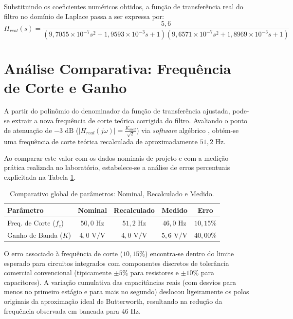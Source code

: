 Substituindo os coeficientes numéricos obtidos, a função de transferência real do filtro no domínio de Laplace passa a ser expressa por:
\begin{equation}
	H_{real}(s) = \frac{5,6}{(9,7055 \times 10^{-7} s^2 + 1,9593 \times 10^{-3} s + 1)(9,6571 \times 10^{-7} s^2 + 1,8969 \times 10^{-3} s + 1)}
\end{equation}

\section{Análise Comparativa: Frequência de Corte e Ganho}

A partir do polinômio do denominador da função de transferência ajustada, pode-se extrair a nova frequência de corte teórica corrigida do filtro. Avaliando o ponto de atenuação de $-3\text{ dB}$ ($|H_{real}(j\omega)| = \frac{K_{med}}{\sqrt{2}}$) via \textit{software} algébrico \cite{maxima}, obtém-se uma frequência de corte teórica recalculada de aproximadamente $51,2\text{ Hz}$.

Ao comparar este valor com os dados nominais de projeto e com a medição prática realizada no laboratório, estabelece-se a análise de erros percentuais explicitada na Tabela \ref{tab:comparativo_erros}.

\begin{table}[htbp]
	\centering
	\caption{Comparativo global de parâmetros: Nominal, Recalculado e Medido.}
	\label{tab:comparativo_erros}
	\begin{tabular}{lcccc}
		\toprule
		\textbf{Parâmetro} & \textbf{Nominal} & \textbf{Recalculado} & \textbf{Medido} & \textbf{Erro} \\
		\midrule
		Freq. de Corte ($f_c$) & $50,0\text{ Hz}$ & $51,2\text{ Hz}$ & $46,0\text{ Hz}$ & $10,15\%$ \\
		Ganho de Banda ($K$) & $4,0\text{ V/V}$ & $4,0\text{ V/V}$ & $5,6\text{ V/V}$ & $40,00\%$ \\
		\bottomrule
	\end{tabular}
\end{table}

O erro associado à frequência de corte ($10,15\%$) encontra-se dentro do limite esperado para circuitos integrados com componentes discretos de tolerância comercial convencional (tipicamente $\pm 5\%$ para resistores e $\pm 10\%$ para capacitores). A variação cumulativa das capacitâncias reais (com desvios para menos no primeiro estágio e para mais no segundo) deslocou ligeiramente os polos originais da aproximação ideal de Butterworth, resultando na redução da frequência observada em bancada para $46\text{ Hz}$.

